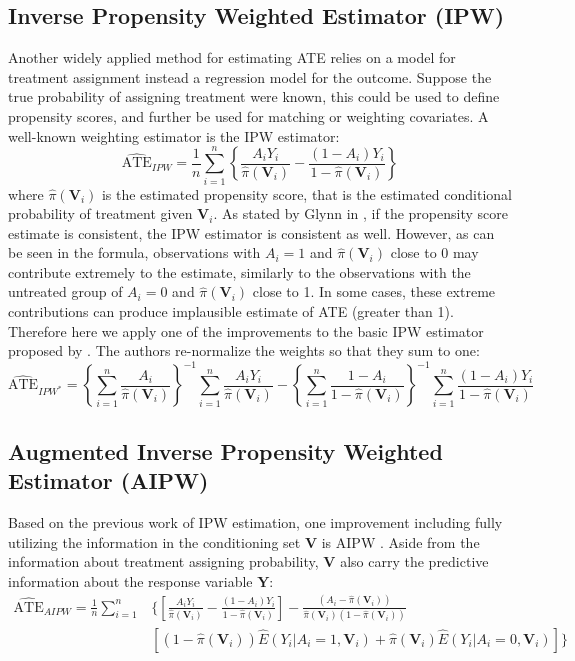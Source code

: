 \documentclass[12pt, oneside]{article}
\newcommand{\bY}{\mathbf{Y}}
\newcommand{\bV}{\mathbf{V}}
\begin{document}
\subsection{Inverse Propensity Weighted Estimator (IPW)}
Another widely applied method for estimating ATE relies on a model for treatment
assignment instead a regression model for the outcome. Suppose the true probability
of assigning treatment were known, this could be used to define propensity scores, and further be used for matching or weighting covariates. A well-known weighting estimator is the IPW estimator:
\begin{equation}
\widehat{\mbox{ATE}}_{IPW}=\frac{1}{n}\sum_{i=1}^n \left\{\frac{A_iY_i}{\hat{\pi}(\bV_i)}-\frac{(1-A_i)Y_i}{1-\hat{\pi}(\bV_i)}\right\}
\end{equation}
where $\hat{\pi}(\bV_i)$ is the estimated propensity score, that is the estimated conditional probability of treatment given $\bV_i$. As stated by Glynn in \cite{Imbens2004}, if the propensity score estimate is consistent, the IPW estimator is consistent as well. However, as can be seen in the formula, observations with $A_i=1$ and $\hat{\pi}(\bV_i)$ close to 0 may contribute extremely to the estimate, similarly to the observations with the untreated group of $A_i=0$ and $\hat{\pi}(\bV_i)$ close to 1. In some cases, these extreme contributions can produce implausible estimate of ATE (greater than 1). Therefore here we apply one of the improvements to the basic IPW estimator proposed by \cite{Imbens2004}. The authors re-normalize the weights so that they sum to one:
\begin{equation}
\widehat{\mbox{ATE}}_{IPW^*}=\left\{\sum_{i=1}^n \frac{A_i}{\hat{\pi}(\bV_i)}\right\}^{-1}\sum_{i=1}^n \frac{A_iY_i}{\hat{\pi}(\bV_i)}-\left\{\sum_{i=1}^n \frac{1-A_i}{1-\hat{\pi}(\bV_i)}\right\}^{-1}\sum_{i=1}^n\frac{(1-A_i)Y_i}{1-\hat{\pi}(\bV_i)}
\end{equation}


\subsection{Augmented Inverse Propensity Weighted \\Estimator (AIPW)}
Based on the previous work of IPW estimation, one improvement including fully utilizing the information in the conditioning set $\bV$ is AIPW \cite{Glynn2010}. Aside from the information about treatment assigning probability, $\bV$ also carry the predictive information about the response variable $\bY$:
\begin{equation}
\begin{split}
\widehat{\mbox{ATE}}_{AIPW} = \frac{1}{n}\sum_{i=1}^n & \bigg\{\left[ \frac{A_iY_i}{\hat{\pi}(\bV_i)}-\frac{(1-A_i)Y_i}{1-\hat{\pi}(\bV_i)}\right] - \frac{(A_i-\hat{\pi}(\bV_i))}{\hat{\pi}(\bV_i)(1-\hat{\pi}(\bV_i))} \\
& [(1-\hat{\pi}(\bV_i))\hat{E}(Y_i|A_i=1,\bV_i)+\hat{\pi}(\bV_i)\hat{E}(Y_i|A_i=0,\bV_i)]\bigg\}
\end{split}
\end{equation}
\end{document}
